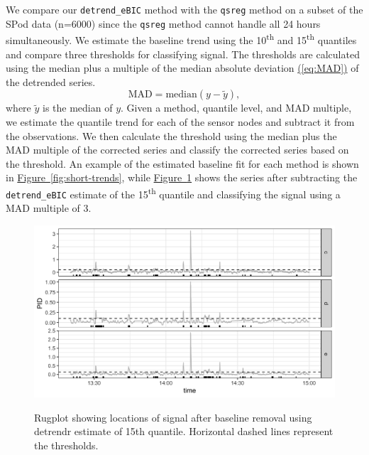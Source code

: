 \documentclass[12pt]{article}
\newcommand{\Eqn}[1]{\hyperref[eq:#1]{{\rm (\ref*{eq:#1})}}} %
\newcommand{\Fig}[1]{\hyperref[fig:#1]{Figure~\ref*{fig:#1}}} %
\newcommand{\Eqn}[1]{{(\ref{eq:#1})}} %
\newcommand{\Fig}[1]{{Figure~\ref{fig:#1}}} %
\begin{document}
	We compare our \texttt{detrend\_eBIC} method with the \texttt{qsreg} method on a subset of the SPod data (n=6000) since the \texttt{qsreg} method cannot handle all 24 hours simultaneously. We estimate the baseline trend using the 10\textsuperscript{th} and 15\textsuperscript{th} quantiles and compare three thresholds for classifying signal. The thresholds are calculated using the median plus a multiple of the median absolute deviation \Eqn{MAD} of the detrended series. 
	\begin{equation}
	\label{eq:MAD}
	\mbox{MAD} = \mbox{median}(y-\tilde{y}),
	\end{equation}
	where $\tilde{y}$ is the median of $y$. Given a method, quantile level, and MAD multiple, we estimate the quantile trend for each of the sensor nodes and subtract it from the observations. We then calculate the threshold using the median plus the MAD multiple of the corrected series and classify the corrected series based on the threshold. An example of the estimated baseline fit for each method is shown in \Fig{short-trends}, while \Fig{rugplot} shows the series after subtracting the \texttt{detrend\_eBIC} estimate of the 15\textsuperscript{th} quantile and classifying the signal using a MAD multiple of 3. 
	 
 	\begin{figure}
	 	\caption{Rugplot showing locations of signal after baseline removal using detrendr estimate of 15th quantile. Horizontal dashed lines represent the thresholds.}
	 	\includegraphics[width = \linewidth]{Figures/corrected_rugplot.png}
	 	\label{fig:rugplot}
	 \end{figure}
	 
\end{document}
